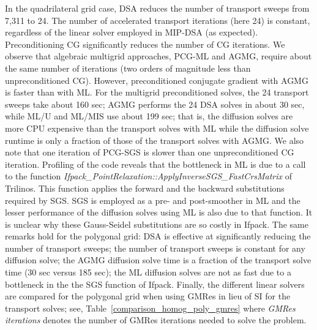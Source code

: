 \documentclass[preprint,10pt]{elsarticle}
\renewcommand{\(}{\left(}
\renewcommand{\)}{\right)}
\renewcommand{\[}{\left[}
\renewcommand{\]}{\right]}
\begin{document}
In the quadrilateral grid case, DSA reduces the number of transport sweeps from 7,311 to 24.
The number of accelerated transport iterations (here 24) is constant, regardless of the linear solver
employed in MIP-DSA (as expected). Preconditioning CG significantly reduces the number of CG iterations.
%
We observe that algebraic multigrid approaches, PCG-ML and AGMG, require 
about the same number of iterations (two orders of magnitude less than unpreconditioned CG). 
However, preconditioned conjugate gradient with AGMG is faster than with ML. For the multigrid preconditioned solves,
the 24 transport sweeps take about 160 sec; AGMG performs the 24 DSA solves in about 30 sec,
while ML/U and ML/MIS use about 199 sec; that is, the diffusion solves are more CPU expensive than the
transport solves with ML while the diffusion solve runtime is only a fraction of those of the transport solves with AGMG. 
We also note that one iteration of PCG-SGS is slower than one unpreconditioned CG iteration. Profiling of the code 
reveals that the bottleneck in ML is due to a call to the function \emph{Ifpack\_PointRelaxation::ApplyInverseSGS\_FastCrsMatrix} 
of Trilinos. This function applies the forward and the backward substitutions required by SGS.
SGS is employed as a pre- and post-smoother in ML and the lesser performance of the 
diffusion solves using ML is also due to that function. 
It is unclear why these Gauss-Seidel substitutions are so costly in Ifpack. 
%
The same remarks hold for the polygonal grid: DSA is effective at significantly reducing the number of transport sweeps; the number of transport sweeps is constant for any diffusion solve; the AGMG diffusion solve time is a fraction
of the transport solve time (30 sec versus 185 sec); the ML diffusion solves are not as fast due to a bottleneck in the the SGS function of Ifpack.
%
Finally, the different linear solvers are compared for the polygonal grid
when using GMRes in lieu of SI for the transport solves; see, 
Table~\ref{comparison_homog_poly_gmres} where {\it GMRes iterations} denotes
the number of GMRes iterations needed to solve the problem. 
\end{document}
